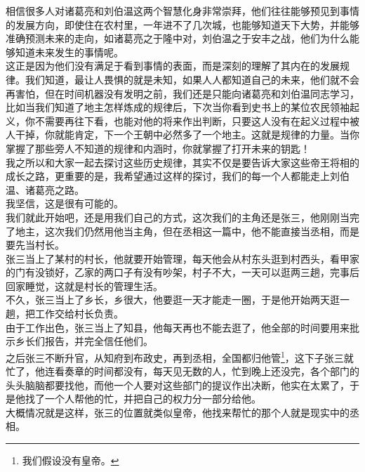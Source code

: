 \begin{multicols}{\theparacolNo}
相信很多人对诸葛亮和刘伯温这两个智慧化身非常崇拜，他们往往能够预见到事情的发展方向，即使住在农村里，一年进不了几次城，也能够知道天下大势，并能够准确预测未来的走向，如诸葛亮之于隆中对，刘伯温之于安丰之战，他们为什么能够知道未来发生的事情呢。\\

这正是因为他们没有满足于看到事情的表面，而是深刻的理解了其内在的发展规律。我们知道，最让人畏惧的就是未知，如果人人都知道自己的未来，他们就不会再害怕，但在时间机器没有发明之前，我们还是只能向诸葛亮和刘伯温同志学习，比如当我们知道了地主怎样炼成的规律后，下次当你看到史书上的某位农民领袖起义，你不需要再往下看，也能对他的将来作出判断，只要这人没有在起义过程中被人干掉，你就能肯定，下一个王朝中必然多了一个地主。这就是规律的力量。当你掌握了那些旁人不知道的规律和内涵时，你就掌握了打开未来的钥匙！\\

我之所以和大家一起去探讨这些历史规律，其实不仅是要告诉大家这些帝王将相的成长之路，更重要的是，我希望通过这样的探讨，我们的每一个人都能走上刘伯温、诸葛亮之路。\\

我坚信，这是很有可能的。\\

我们就此开始吧，还是用我们自己的方式，这次我们的主角还是张三，他刚刚当完了地主，这次我们仍然用他当主角，但在丞相这一篇中，他不能直接当丞相，而是要先当村长。\\

张三当上了某村的村长，他就要开始管理，每天他会从村东头逛到村西头，看甲家的门有没锁好，乙家的两口子有没有吵架，村子不大，一天可以逛两三趟，完事后回家睡觉，这就是村长的管理生活。\\

不久，张三当上了乡长，乡很大，他要逛一天才能走一圈，于是他开始两天逛一趟，把工作交给村长负责。\\

由于工作出色，张三当上了知县，他每天再也不能去逛了，他全部的时间要用来批示乡长们报告，并完全信任他们。\\

之后张三不断升官，从知府到布政史，再到丞相，全国都归他管\footnote{我们假设没有皇帝。}，这下子张三就忙了，他连看奏章的时间都没有，每天见无数的人，忙到晚上还没完，各个部门的头头脑脑都要找他，而他一个人要对这些部门的提议作出决断，他实在太累了，于是他找了一个人帮他的忙，并把自己的权力分一部分给他。\\

大概情况就是这样，张三的位置就类似皇帝，他找来帮忙的那个人就是现实中的丞相。\\


\end{multicols}
